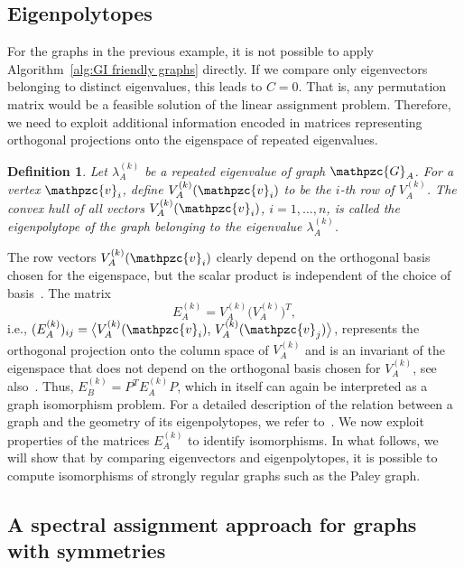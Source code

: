 \documentclass
[
    a4paper,
    DIV=11,
    abstracton
]
{scrartcl}
\newcommand{\mc}[1]{\mathpzc{#1}}
\newtheorem{definition}[theorem]{Definition}
\theoremstyle{definition}
\begin{document}
\subsection{Eigenpolytopes}

For the graphs in the previous example, it is not possible to apply Algorithm~\ref{alg:GI friendly graphs} directly. If we compare only eigenvectors belonging to distinct eigenvalues, this leads to $ C = 0 $. That is, any permutation matrix would be a feasible solution of the linear assignment problem. Therefore, we need to exploit additional information encoded in matrices representing orthogonal projections onto the eigenspace of repeated eigenvalues.

\begin{definition}
Let $ \lambda_A^{(k)} $ be a repeated eigenvalue of graph $ \mc{G}_A $. For a vertex $ \mc{v}_i $, define $ V_A^{(k)}(\mc{v}_i) $ to be the $ i $-th row of $ V_A^{(k)} $. The convex hull of all vectors $ V_A^{(k)}(\mc{v}_i) $, $ i = 1, \dots, n $, is called the \emph{eigenpolytope} of the graph belonging to the eigenvalue $ \lambda_A^{(k)} $.
\end{definition}

The row vectors $ V_A^{(k)}(\mc{v}_i) $ clearly depend on the orthogonal basis chosen for the eigenspace, but the scalar product is independent of the choice of basis~\cite{God98}. The matrix
\begin{equation*}
    E_A^{(k)} = V_A^{(k)} \big(V_A^{(k)}\big)^T,
\end{equation*}
i.e., $ (E_A^{(k)})_{ij} = \big\langle V_A^{(k)}(\mc{v}_i), \, V_A^{(k)}(\mc{v}_j) \big\rangle $, represents the orthogonal projection onto the column space of $ V_A^{(k)} $ and is an invariant of the eigenspace that does not depend on the orthogonal basis chosen for $ V_A^{(k)} $, see also~\cite{CG97}. Thus, $ E_B^{(k)} = P^T E_A^{(k)} P $, which in itself can again be interpreted as a graph isomorphism problem. For a detailed description of the relation between a graph and the geometry of its eigenpolytopes, we refer to~\cite{God98, CG97}. We now exploit properties of the matrices $ E_A^{(k)} $ to identify isomorphisms. In what follows, we will show that by comparing eigenvectors and eigenpolytopes, it is possible to compute isomorphisms of strongly regular graphs such as the Paley graph.

\subsection{A spectral assignment approach for graphs with symmetries}
\end{document}
